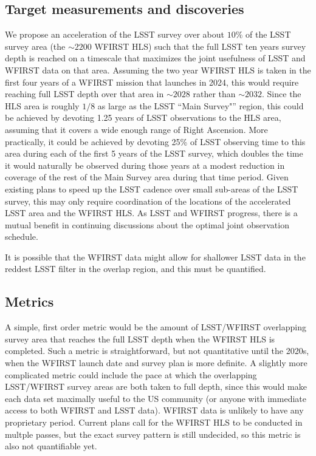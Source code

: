 
\subsection{Target measurements and discoveries}
\label{sec:\secname:targets}

We propose an acceleration of the LSST survey over about $10\%$ of the
LSST survey area (the $\sim2200$ WFIRST HLS) such that the full LSST ten
years survey depth is reached on a timescale that maximizes the joint
usefulness of LSST and WFIRST data on that area.  Assuming the two year
WFIRST HLS is taken in the first four years of a WFIRST mission that
launches in 2024, this would require reaching full LSST depth over that
area in $\sim2028$ rather than $\sim2032$. Since the HLS area is roughly
$1/8$ as large as the LSST ``Main Survey"'' region, this could be
achieved by devoting 1.25 years of LSST observations to the HLS area,
assuming that it covers a wide enough range of Right Ascension.  More
practically, it could be achieved by devoting 25\% of LSST observing
time to this area during each of the first 5 years of the LSST survey,
which doubles the time it would naturally be observed during those years
at a modest reduction in coverage of the rest of the Main Survey area
during that time period.   Given existing plans to speed up the LSST
cadence over small sub-areas of the LSST survey, this may only require
coordination of the locations of the accelerated LSST area and the
WFIRST HLS. As LSST and WFIRST progress, there is a mutual benefit in
continuing discussions about the optimal joint observation schedule.

It is possible that the WFIRST data might allow for shallower LSST data
in the reddest LSST filter in the overlap region, and this must be
quantified.



\subsection{Metrics}
\label{sec:\secname:metrics}

A simple, first order metric would be the amount of LSST/WFIRST
overlapping survey area that reaches the full LSST depth when the WFIRST
HLS is completed.  Such a metric is straightforward, but not
quantitative until the 2020s, when the WFIRST launch date and survey
plan is more definite.  A slightly more complicated metric could include
the pace at which the overlapping LSST/WFIRST survey areas are both
taken to full depth, since this would make each data set maximally
useful to the US community (or anyone with immediate access to both
WFIRST and LSST data).  WFIRST data is unlikely to have any proprietary
period.  Current plans call for the WFIRST HLS to be conducted in
multple passes, but the exact survey pattern is still undecided, so this
metric is also not quantifiable yet.

